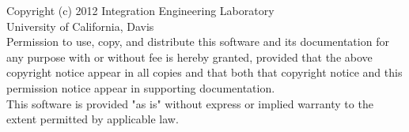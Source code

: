 \newpage
\noindent
Copyright (c) 2012 Integration Engineering Laboratory\\
University of California, Davis \\
\newline
Permission to use, copy, and distribute this software and its
documentation for any purpose with or without fee is hereby granted,
provided that the above copyright notice appear in all copies and
that both that copyright notice and this permission notice appear
in supporting documentation.\\
\newline
This software is provided "as is" without express or implied warranty
to the extent permitted by applicable law.
